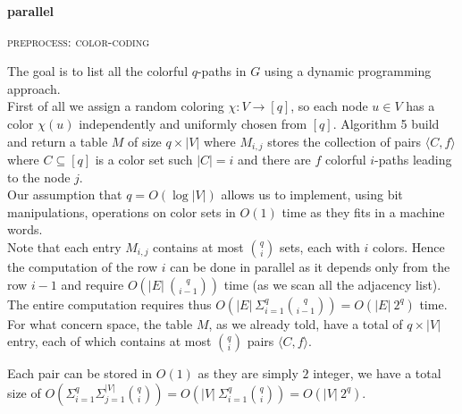 \begin{algorithm}[h]
	
	\small
	\DontPrintSemicolon
	\BlankLine
	\textbf{parallel} 
	\BlankLine
	\caption{\textsc{preprocess}: \textsc{color-coding}}
	\label{alg:color-coding}
\end{algorithm}

The goal is to list all the colorful $q$-paths in $G$ using a dynamic programming approach.\\

First of all we assign a random coloring $\chi : V \rightarrow [q]$, so each node $u \in V$ has a color $\chi(u)$ independently and uniformly chosen from $[q]$.
Algorithm 5 build and return a table $M$ of size $q \times |V|$ 
where $M_{i,j}$ stores the collection of pairs $\langle C, f \rangle$ where  $C \subseteq [q]$ is a color set such $|C| = i$ and there are $f$ colorful $i$-paths leading to the node $j$.\\

Our assumption that $q = O(\log |V|)$ allows us to implement, using bit manipulations, operations on color sets in $O(1)$ time as they fits in a machine words.\\

Note that each entry $M_{i, j}$ contains at most $\binom{q}{i}$ sets, each with $i$ colors.
Hence the computation of the row $i$ can be done in parallel as it depends only from the row $i-1$ and require $O(|E|\ \binom{q}{i-1})$ time (as we scan all the adjacency list).
The entire computation requires thus $O(|E|\ \Sigma_{i=1}^{q}{\binom{q}{i-1}}) = O(|E|\ 2^{q})$ time.\\

For what concern space, the table $M$, as we already told, have a total of $q \times |V|$ entry, each of which contains at most $\binom{q}{i}$ pairs $\langle C, f \rangle$.

Each pair can be stored in $O(1)$ as they are simply $2$ integer, we have a total size of $O(\Sigma_{i=1}^{q}{\Sigma_{j=1}^{|V|}{ \binom{q}{i}}}) = O(|V|\ \Sigma_{i=1}^{q}{\binom{q}{i}}) = O(|V|\ 2^{q})$.

